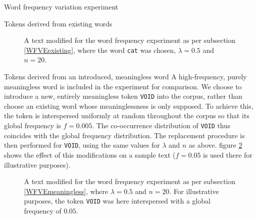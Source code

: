 \documentclass{article} %
\newcommand{\word}[1]{\texttt{#1}}
\begin{document}
\begin{section}{Word frequency variation experiment}
\begin{subsection}{Tokens derived from existing words}
\begin{table}\label{word-frequency-counts}
	
	\caption{Occurrence counts for words chosen for the word frequency experiment. }
\end{table}

\begin{figure}\label{fig:word-frequency-experiment-text-cat}
	\begin{mdframed}
	
	\end{mdframed}
	\caption{A text modified for the word frequency experiment as per subsection \ref{WFVEexisting}, where the
	word \word{cat} was chosen, $\lambda=0.5$ and $n=20$.}
\end{figure}

\end{subsection}

\begin{subsection}{Tokens derived from an introduced, meaningless word}\label{WFVEmeaningless}
	A high-frequency, purely meaningless word is included in the experiment for comparison.
	We choose to introduce a new, entirely meaningless token \word{VOID} into the corpus, rather than choose an existing word whose meaninglessness is only supposed.
	To achieve this, the token is interspersed uniformly at random throughout the corpus so that its global frequency is $f = 0.005$.
	The co-occurrence distribution of \word{VOID} thus coincides with the global frequency distribution.
	The replacement procedure is then performed for \word{VOID}, using the same values for $\lambda$ and $n$ as above.
	figure \ref{fig:word-frequency-experiment-text-void} shows the effect of this modifications on a sample text ($f = 0.05$ is used there for illustrative purposes).

\begin{figure}\label{fig:word-frequency-experiment-text-void}
	\begin{mdframed}
	
	\end{mdframed}
	\caption{A text modified for the word frequency experiment as per subsection \ref{WFVEmeaningless}, where $\lambda=0.5$ and $n=20$. For illustrative purposes, the token \word{VOID} was here interspersed with a global frequency of $0.05$.}
\end{figure}
\end{subsection}


\end{section}
\end{document}

